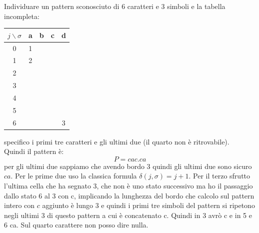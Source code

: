 \documentclass[a4paper,12pt, oneside]{book}
\begin{document}
\begin{esempio}
  Individuare un pattern sconosciuto di 6 caratteri e 3 simboli e la tabella
  incompleta:
  \begin{table}[H]
    \centering
    \begin{tabular}[H]{c||c|c|c|c}
      $j\backslash\sigma$ & a & b & c & d\\
      \hline
      \hline
      0 & 1 &  &  & \\
      1 & 2 &  &  & \\
      2 &  &  &  & \\
      3 &  &  &  & \\
      4 &  &  &  & \\ 
      5 &  &  &  & \\
      6 &  &  &  & 3  
    \end{tabular}
  \end{table}
  specifico i primi tre caratteri e gli ultimi due (il quarto non è
  ritrovabile).\\
  Quindi il pattern è:
  \[P=cac.ca\]
  per gli ultimi due sappiamo che avendo bordo 3 quindi gli ultimi due sono
  sicuro $ca$. Per le prime due uso la classica formula
  $\delta(j,\sigma)=j+1$. Per il terzo sfrutto l'ultima cella che ha segnato 3,
  che non è uno stato successivo ma ho il passaggio dallo stato 6 al 3 con c,
  implicando la lunghezza del bordo che calcolo sul pattern intero con $c$
  aggiunto è lungo 3 e quindi i primi tre simboli del pattern si ripetono negli
  ultimi 3 di questo pattern a cui è concatenato c. Quindi in 3 avrò c e in 5 e
  6 ca. Sul quarto carattere non posso dire nulla.
\end{esempio}
\end{document}
